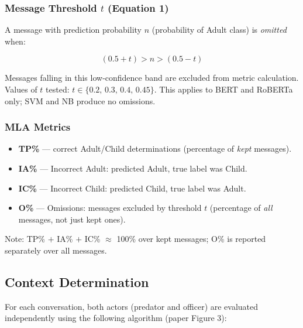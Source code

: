 \documentclass[12pt,a4paper]{article}
\begin{document}
\subsubsection{Message Threshold \texorpdfstring{$t$}{t} (Equation 1)}

A message with prediction probability $n$ (probability of Adult class) is
\emph{omitted} when:

\begin{equation}
  (0.5 + t) > n > (0.5 - t)
  \label{eq:threshold}
\end{equation}

Messages falling in this low-confidence band are excluded from metric
calculation. Values of $t$ tested:
$t \in \{0.2,\, 0.3,\, 0.4,\, 0.45\}$.
This applies to BERT and RoBERTa only; SVM and NB produce no omissions.

\subsubsection{MLA Metrics}

\begin{itemize}[leftmargin=*]
  \item \textbf{TP\%} --- correct Adult/Child determinations
        (percentage of \emph{kept} messages).
  \item \textbf{IA\%} --- Incorrect Adult: predicted Adult, true label was
        Child.
  \item \textbf{IC\%} --- Incorrect Child: predicted Child, true label was
        Adult.
  \item \textbf{O\%} --- Omissions: messages excluded by threshold $t$
        (percentage of \emph{all} messages, not just kept ones).
\end{itemize}

Note: TP\% $+$ IA\% $+$ IC\% $\approx$ 100\% over kept messages; O\%
is reported separately over all messages.

\subsection{Context Determination}

For each conversation, both actors (predator and officer) are evaluated
independently using the following algorithm (paper Figure 3):
\end{document}
